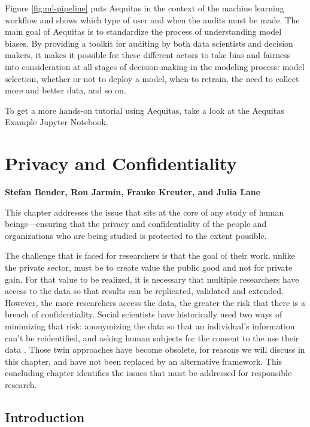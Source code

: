 \documentclass[]{krantz}
\begin{document}
Figure \ref{fig:ml-pipeline} puts Aequitas in the context of the machine
learning workflow and shows which type of user and when the audits must
be made. The main goal of Aequitas is to standardize the process of
understanding model biases. By providing a toolkit for auditing by both
data scientists and decision makers, it makes it possible for these
different actors to take bias and fairness into consideration at all
stages of decision-making in the modeling process: model selection,
whether or not to deploy a model, when to retrain, the need to collect
more and better data, and so on.

To get a more hands-on tutorial using Aequitas, take a look at the
Aequitas Example Jupyter Notebook.

\hypertarget{chap:privacy}{\chapter{Privacy and
Confidentiality}\label{chap:privacy}}

\textbf{Stefan Bender, Ron Jarmin, Frauke Kreuter, and Julia Lane}

This chapter addresses the issue that sits at the core of any study of
human beings---ensuring that the privacy and confidentiality of the
people and organizations who are being studied is protected to the
extent possible.

The challenge that is faced for researchers is that the goal of their
work, unlike the private sector, must be to create value the public good
and not for private gain. For that value to be realized, it is necessary
that multiple researchers have access to the data so that results can be
replicated, validated and extended. However, the more researchers access
the data, the greater the risk that there is a breach of
confidentiality. Social scientists have historically used two ways of
minimizing that risk: anonymizing the data so that an individual's
information can't be reidentified, and asking human subjects for the
consent to the use their data \citep{NationalAcademies2014}. Those twin
approaches have become obsolete, for reasons we will discuss in this
chapter, and have not been replaced by an alternative framework. This
concluding chapter identifies the issues that must be addressed for
responsible research.

\section{Introduction}\label{introduction-5}
\end{document}
